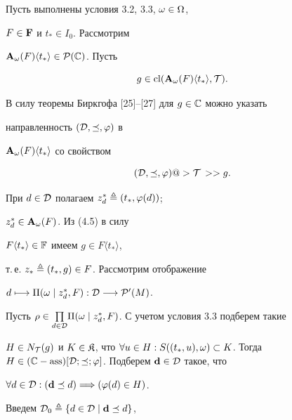 \begin{pf}


Пусть выполнены условия 3.2, 3.3, $\omega \in \Omega$,


$F \in {\bold F}$ и ${t_*} \in {I_0}$. Рассмотрим


${{\bold A}_\omega}(F)\langle{t_*}\rangle \in {{\cal P}({\Bbb C})}$. Пусть


\begin{equation}


g \in \mathrm{cl}({{\bold A}_\omega}(F)\langle{t_*}\rangle,{\cal T}).


\end{equation}


В силу теоремы Биркгофа [25]--[27] для $g \in {\Bbb C}$ можно указать


направленность $({\cal D},\preceq,\varphi)$ в


${{\bold A}_\omega}(F)\langle{t_*}\rangle$ со свойством


\begin{equation}


({\cal D},\preceq,\vp) @>{\cal T\,}>> g.


\end{equation}


При $d \in {\cal D}$ полагаем ${z_d^*} \triangleq ({t_*},{{\varphi}(d)})$;


${z_d^*} \in {{\bold A}_\omega}(F)$. Из (4.5) в силу


${F\langle{t_*}\rangle} \in {\Bbb F}$ имеем $g \in {F\langle{t_*}\rangle}$,


т.\,е. ${z_*} \triangleq ({t_*},g) \in F$. Рассмотрим отображение


$d \longmapsto {\Pi}(\omega \mid {z_d^*},F):{\cal D} \lo


{{\cal P}'}(M)$.


Пусть $\rho \in {\prod\limits_{d \in {\cal D}}}{\Pi}(\omega \mid


{z_d^*},F)$. С учетом условия 3.3 подберем такие


$H \in {N_{\cal T}}(g)$ и $K \in {\frak K}$, что $\fo{u} \in H:


S(({t_*},u),\omega) \subset K$. Тогда $H \in ({\Bbb C} - {\ass})[{\cal


D};\preceq;\vp]$. Подберем ${\bold d} \in {\cal D}$ такое, что


$\forall{d} \in {\cal D}:({\bold d} \preceq d) \Longrightarrow ({\varphi}(d) \in H)$.


Введем ${{\cal D}_0} \triangleq \{d \in {\cal D} \mid {\bold d} \preceq d\}$,



\end{pf}
